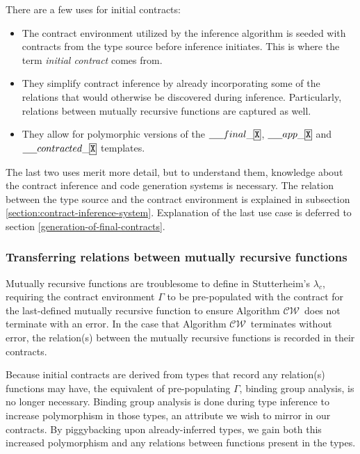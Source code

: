 \documentclass[10pt]{report}
\newcommand{\CW}{$\mathcal{CW}$}
\newcommand{\ctrttemplate}{\underline{\hspace{1.5em}}contracted\_\code{X}}
\newcommand{\finaltemplate}{\underline{\hspace{1.5em}}final\_\code{X}}
\newcommand{\apptemplate}{\underline{\hspace{1.5em}}app\_\code{X}}
\newcommand{\code}[1]{%
  {%
   \setlength{\fboxsep}{-2\fboxrule}%
   \fcolorbox{black}{light-gray}{\hspace{1.5pt}\strut\texttt{#1}\hspace{1.5pt}}%
  }%
}
\begin{document}
There are a few uses for initial contracts:

\begin{itemize}
	\item The contract environment utilized by the inference algorithm is seeded with contracts from the type source before inference initiates. This is where the term \textit{initial contract} comes from. 
	\item They simplify contract inference by already incorporating some of the relations that would otherwise be discovered during inference. Particularly, relations between mutually recursive functions are captured as well.
	\item They allow for polymorphic versions of the $\finaltemplate$, $\apptemplate$ and $\ctrttemplate$ templates. 
\end{itemize}

The last two uses merit more detail, but to understand them, knowledge about the contract inference and code generation systems is necessary.
The relation between the type source and the contract environment is explained in subsection \ref{section:contract-inference-system}.
Explanation of the last use case is deferred to section \ref{generation-of-final-contracts}.

\subsubsection{Transferring relations between mutually recursive functions}

Mutually recursive functions are troublesome to define in Stutterheim's $\lambda_c$, requiring the contract environment $\Gamma$ to be pre-populated with the contract for the last-defined mutually recursive function to ensure Algorithm \CW ~does not terminate with an error.
In the case that Algorithm \CW ~terminates without error, the relation(s) between the mutually recursive functions is recorded in their contracts.

Because initial contracts are derived from types that record any relation(s) functions may have, the equivalent of pre-populating $\Gamma$, binding group analysis, is no longer necessary.
Binding group analysis is done during type inference to increase polymorphism in those types, an attribute we wish to mirror in our contracts.
By piggybacking upon already-inferred types, we gain both this increased polymorphism and any relations between functions present in the types.
\end{document}
